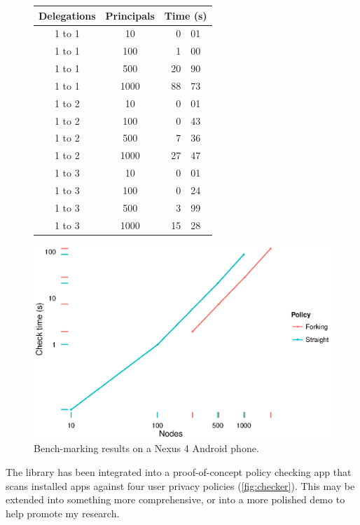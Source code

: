 \documentclass[a4paper]{scrartcl}
\begin{document}
\begin{figure}
  \begin{minipage}{0.40\linewidth}
    \scriptsize
    \begin{tabular*}{0.80\linewidth}{c c r@{.}l}
      \toprule
      Delegations & Principals & \multicolumn{2}{c}{Time (s)} \\
      \midrule
      1 to 1 & 10   &  0&01 \\
      1 to 1 & 100  &  1&00 \\
      1 to 1 & 500  & 20&90 \\
      1 to 1 & 1000 & 88&73 \\
      \midrule
      1 to 2 & 10   &  0&01 \\
      1 to 2 & 100  &  0&43 \\
      1 to 2 & 500  &  7&36 \\
      1 to 2 & 1000 & 27&47 \\
      \midrule
      1 to 3 & 10   &  0&01 \\
      1 to 3 & 100  &  0&24 \\
      1 to 3 & 500  &  3&99 \\
      1 to 3 & 1000 & 15&28 \\
      \bottomrule
    \end{tabular*}
  \end{minipage}
  \begin{minipage}{0.60\linewidth}
    \includegraphics[width=\linewidth]{./images/benchmarks.eps}
  \end{minipage}
  \caption{Bench-marking results on a Nexus 4 Android phone.}
  \label{fig:benchmarks}
\end{figure}

The library has been integrated into a proof-of-concept policy checking app that scans installed apps against four user privacy policies (\autoref{fig:checker}).
This may be extended into something more comprehensive, or into a more polished demo to help promote my research.
\end{document}
